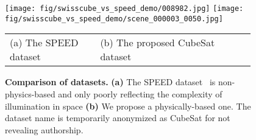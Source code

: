 

\begin{figure}[t]
\begin{minipage}{\linewidth}
\centering
\texttt{[image: fig/swisscube\_vs\_speed\_demo/008982.jpg]}
\hspace{1em}
\texttt{[image: fig/swisscube\_vs\_speed\_demo/scene\_000003\_0050.jpg]}
\begin{scriptsize}
\begin{tabular}{C{0.35\linewidth}C{0.6\linewidth}}
(a) The SPEED dataset & (b) The proposed CubeSat dataset
\end{tabular}
\end{scriptsize}

\vspace{-6mm}
\caption{\small {\bf Comparison of datasets.} {\bf (a)} The SPEED dataset~\cite{Kisantal20} is non-physics-based and only poorly reflecting the complexity of illumination in space {\bf (b)} We propose a physically-based one. The dataset name is temporarily anonymized as CubeSat for not revealing authorship.
}
\label{fig:swisscube_vs_speed_demo}
\end{minipage}
\end{figure}